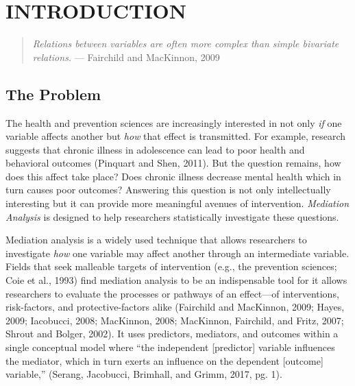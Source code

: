 \documentclass[]{DissertateUSU}
\begin{document}
\newpage

 \fancyhead[R]{\thepage} \fancyfoot[C]{}
\listoftables

\newpage

 \fancyhead[R]{\thepage} \fancyfoot[C]{}
\listoffigures

\newpage


\newpage

 \fancyhead[R]{\thepage} \fancyfoot[C]{}

\chapter{INTRODUCTION}

\begin{quote}
\emph{Relations between variables are often more complex than simple bivariate relations.}
--- Fairchild and MacKinnon, 2009
\end{quote}

\doublespacing

\section{The Problem}\label{the-problem}

The health and prevention sciences are increasingly interested in not
only \emph{if} one variable affects another but \emph{how} that effect
is transmitted. For example, research suggests that chronic illness in
adolescence can lead to poor health and behavioral outcomes (Pinquart
and Shen, 2011). But the question remains, how does this affect take
place? Does chronic illness decrease mental health which in turn causes
poor outcomes? Answering this question is not only intellectually
interesting but it can provide more meaningful avenues of intervention.
\emph{Mediation Analysis} is designed to help researchers statistically
investigate these questions.

Mediation analysis is a widely used technique that allows researchers to
investigate \emph{how} one variable may affect another through an
intermediate variable. Fields that seek malleable targets of
intervention (e.g., the prevention sciences; Coie et al., 1993) find
mediation analysis to be an indispensable tool for it allows researchers
to evaluate the processes or pathways of an effect---of interventions,
risk-factors, and protective-factors alike (Fairchild and MacKinnon,
2009; Hayes, 2009; Iacobucci, 2008; MacKinnon, 2008; MacKinnon,
Fairchild, and Fritz, 2007; Shrout and Bolger, 2002). It uses
predictors, mediators, and outcomes within a single conceptual model
where ``the independent {[}predictor{]} variable influences the
mediator, which in turn exerts an influence on the dependent
{[}outcome{]} variable,'' (Serang, Jacobucci, Brimhall, and Grimm, 2017,
pg. 1).
\end{document}
